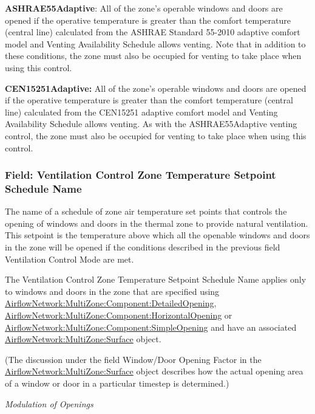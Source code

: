\textbf{ASHRAE55Adaptive}: All of the zone's operable windows and doors are opened if the operative temperature is greater than the comfort temperature (central line) calculated from the ASHRAE Standard 55-2010 adaptive comfort model and Venting Availability Schedule allows venting. Note that in addition to these conditions, the zone must also be occupied for venting to take place when using this control.

\textbf{CEN15251Adaptive:} All of the zone's operable windows and doors are opened if the operative temperature is greater than the comfort temperature (central line) calculated from the CEN15251 adaptive comfort model and Venting Availability Schedule allows venting. As with the ASHRAE55Adaptive venting control, the zone must also be occupied for venting to take place when using this control.

\subsubsection{Field: Ventilation Control Zone Temperature Setpoint Schedule Name}\label{field-ventilation-control-zone-temperature-setpoint-schedule-name}

The name of a schedule of zone air temperature set points that controls the opening of windows and doors in the thermal zone to provide natural ventilation. This setpoint is the temperature above which all the openable windows and doors in the zone will be opened if the conditions described in the previous field Ventilation Control Mode are met.

The Ventilation Control Zone Temperature Setpoint Schedule Name applies only to windows and doors in the zone that are specified using \hyperref[airflownetworkmultizonecomponentdetailedopening]{AirflowNetwork:MultiZone:Component:DetailedOpening}, \hyperref[airflownetworkmultizonecomponenthorizontalopening]{AirflowNetwork:MultiZone:Component:HorizontalOpening} or \hyperref[airflownetworkmultizonecomponentsimpleopening]{AirflowNetwork:MultiZone:Component:SimpleOpening} and have an associated \hyperref[airflownetworkmultizonesurface]{AirflowNetwork:MultiZone:Surface} object.

(The discussion under the field Window/Door Opening Factor in the \hyperref[airflownetworkmultizonesurface]{AirflowNetwork:MultiZone:Surface} object describes how the actual opening area of a window or door in a particular timestep is determined.)

\emph{Modulation of Openings}

